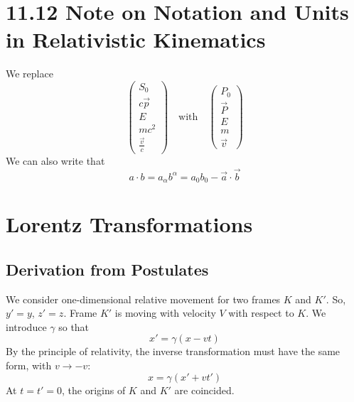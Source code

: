 \documentclass{article}
\begin{document}
	\section*{11.12 Note on Notation and Units in Relativistic Kinematics}
	
	We replace
	\[
	\begin{pmatrix} S_0 \\ c\vec{p} \\ E \\ m c^2 \\ \frac{\vec{v}}{c} \end{pmatrix}
	\quad \text{with} \quad
	\begin{pmatrix} P_0 \\ \vec{P} \\ E \\ m \\ \vec{v} \end{pmatrix}
	\]
	We can also write that
	\[
	a \cdot b = a_\alpha b^\alpha = a_0 b_0 - \vec{a} \cdot \vec{b}
	\]
	
	\section*{Lorentz Transformations}
	
	\subsection*{Derivation from Postulates}
	We consider one-dimensional relative movement for two frames $K$ and $K'$. So, $y'=y$, $z'=z$.
	Frame $K'$ is moving with velocity $V$ with respect to $K$. We introduce $\gamma$ so that
	\begin{equation}
		x' = \gamma(x - vt)
	\end{equation}
	By the principle of relativity, the inverse transformation must have the same form, with $v \to -v$:
	\begin{equation}
		x = \gamma(x' + vt')
	\end{equation}
	At $t = t' = 0$, the origins of $K$ and $K'$ are coincided.
	
\end{document}

